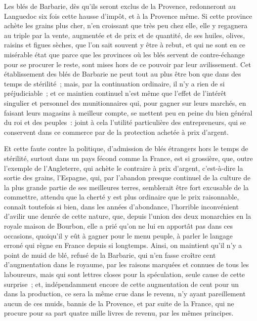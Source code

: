 \documentclass[french,twoside]{book} %
\begin{document}
Les blés de Barbarie, dès qu’ils seront exclus de la Provence, redonneront au Languedoc six fois cette hausse d’impôt, et à la Provence même. Si cette province achète les grains plus cher, n’en croissant que très peu chez elle, elle y regagnera au triple par la vente, augmentée et de prix et de quantité, de ses huiles, olives, raisins et figues sèches, que l’on sait souvent y être à rebut, et qui ne sont en ce misérable état que parce que les provinces où les blés servent de contre-échange pour se procurer le reste, sont mises hors de ce pouvoir par leur avilissement. Cet établissement des blés de Barbarie ne peut tout au plus être bon que dans des temps de stérilité ; mais, par la continuation ordinaire, il n’y a rien de si préjudiciable ; et ce maintien continuel n’est même que l’effet de l’intérêt singulier et personnel des munitionnaires qui, pour gagner sur leurs marchés, en faisant leurs magasins à meilleur compte, se mettent peu en peine du bien général du roi et des peuples : joint à cela l’utilité particulière des entrepreneurs, qui se conservent dans ce commerce par de la protection achetée à prix d’argent.\par
Et cette faute contre la politique, d’admission de blés étrangers hors le temps de stérilité, surtout dans un pays fécond comme la France, est si grossière, que, outre l’exemple de l’Angleterre, qui achète le contraire à prix d’argent, c’est-à-dire la sortie des grains, l’Espagne, qui, par l’abandon presque continuel de la culture de la plus grande partie de ses meilleures terres, semblerait être fort excusable de la commettre, attendu que la cherté y est plus ordinaire que le prix raisonnable, connaît toutefois si bien, dans les années d’abondance, l’horrible inconvénient d’avilir une denrée de cette nature, que, depuis l’union des deux monarchies en la royale maison de Bourbon, elle a prié qu’on ne lui en apportât pas dans ces occasions, quoiqu’il y eût à gagner pour le menu peuple, à parler le langage erroné qui règne en France depuis si longtemps. Ainsi, on maintient qu’il n’y a point de muid de blé, refusé de la Barbarie, qui n’en fasse croître cent d’augmentation dans le royaume, par les raisons marquées et connues de tous les laboureurs, mais qui sont lettres closes pour la spéculation, seule cause de cette surprise ; et, indépendamment encore de cette augmentation de cent pour un dans la production, ce sera la même crue dans le revenu, n’y ayant pareillement aucun de ces muids, bannis de la Provence, et par suite de la France, qui ne procure pour sa part quatre mille livres de revenu, par les mêmes principes.\par
\end{document}
